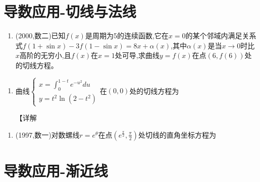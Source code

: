 \documentclass[12pt, a4paper, oneside, UTF8]{ctexbook}
\begin{document}
\section{导数应用-切线与法线}

\begin{remark}
\end{remark}

\begin{enumerate}[label=\arabic*.,start=10]
    \item  (2000,数二)已知$f(x)$是周期为5的连续函数,它在$x=0$的某个邻域内满足关系式$f(1+\sin x)-3f(1-\sin x)=8x+\alpha(x)$,其中$\alpha(x)$是当$x\to0$时比$x$高阶的无穷小,且$f(x)$在$x=1$处可导,求曲线$y=f(x)$在点$(6,f(6))$处的切线方程。
    
    \begin{solution}
    \newpage
    \end{solution}
\end{enumerate}

\begin{remark}
\end{remark}

\begin{enumerate}[label=\arabic*.,start=11]
    \item  曲线$\begin{cases}
        x=\int_0^{1-t}e^{-u^2}du \\
        y=t^2\ln(2-t^2)
    \end{cases}$在$(0,0)$处的切线方程为\underline{\quad}
    
    \begin{solution}
    【详解
    \end{solution}
\end{enumerate}

\begin{remark}
\end{remark}

\begin{enumerate}[label=\arabic*.,start=12]
    \item  (1997,数一)对数螺线$r=e^\theta$在点$(e^\frac{\pi}{2},\frac{\pi}{2})$处切线的直角坐标方程为\underline{\quad}
    
    \begin{solution}
    \newpage
    \end{solution}
\end{enumerate}

\section{导数应用-渐近线}
\end{document}

